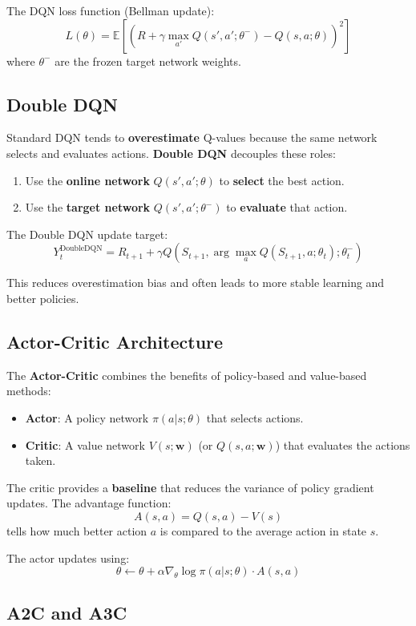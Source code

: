 \documentclass[11pt,a4paper]{article}
\begin{document}
The DQN loss function (Bellman update):
\[
L(\theta) = \mathbb{E} [(R + \gamma \max_{a'} Q(s', a'; \theta^-) - Q(s, a; \theta))^2]
\]
where $\theta^-$ are the frozen target network weights.

\subsection{Double DQN}

Standard DQN tends to \textbf{overestimate} Q-values because the same network selects and evaluates actions. \textbf{Double DQN} decouples these roles:
\begin{enumerate}
    \item Use the \textbf{online network} $Q(s', a'; \theta)$ to \textbf{select} the best action.
    \item Use the \textbf{target network} $Q(s', a'; \theta^-)$ to \textbf{evaluate} that action.
\end{enumerate}

The Double DQN update target:
\[
Y_t^{\text{DoubleDQN}} = R_{t+1} + \gamma Q(S_{t+1}, \arg\max_a Q(S_{t+1}, a; \theta_t); \theta_t^-)
\]

This reduces overestimation bias and often leads to more stable learning and better policies.

\subsection{Actor-Critic Architecture}

The \textbf{Actor-Critic} combines the benefits of policy-based and value-based methods:
\begin{itemize}
    \item \textbf{Actor}: A policy network $\pi(a|s; \theta)$ that selects actions.
    \item \textbf{Critic}: A value network $V(s; \mathbf{w})$ (or $Q(s,a; \mathbf{w})$) that evaluates the actions taken.
\end{itemize}

The critic provides a \textbf{baseline} that reduces the variance of policy gradient updates. The advantage function:
\[
A(s, a) = Q(s, a) - V(s)
\]
tells how much better action $a$ is compared to the average action in state $s$.

The actor updates using:
\[
\theta \leftarrow \theta + \alpha \nabla_\theta \log \pi(a|s; \theta) \cdot A(s, a)
\]

\subsection{A2C and A3C}
\end{document}
